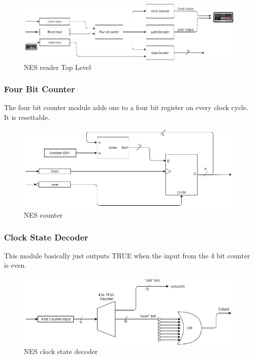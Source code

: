 \documentclass[a4paper]{article}
\begin{document}
\begin{figure}[H]
    \includegraphics[width=0.8 \linewidth]{images/NESreadertop.JPG}
    \caption{NES reader Top Level}
    \label{nestop}
\end{figure}

\subsubsection{Four Bit Counter}

The four bit counter module adds one to a four bit register on every clock cycle. It is resettable.

\begin{figure}[H]
    \includegraphics[width=0.8 \linewidth]{images/NEScounter.JPG}
    \caption{NES counter}
    \label{nestop}
\end{figure}

\subsubsection{Clock State Decoder}

This module basically just outputs TRUE when the input from the 4 bit counter is even.

\begin{figure}[H]
    \includegraphics[width=0.8 \linewidth]{images/NESclockdecoder.JPG}
    \caption{NES clock state decoder}
    \label{nesdecoder}
\end{figure}
\end{document}
